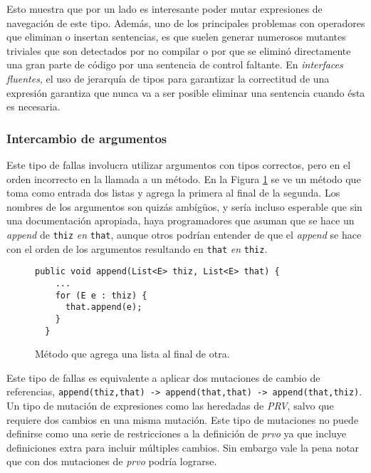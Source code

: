 Esto muestra que por un lado es interesante poder mutar expresiones de navegaci\'on de este tipo. Adem\'as, uno de los principales problemas con operadores que eliminan o insertan sentencias, es que suelen generar numerosos mutantes triviales que son detectados por no compilar o por que se elimin\'o directamente una gran parte de c\'odigo por una sentencia de control faltante. En \emph{interfaces fluentes}, el uso de jerarqu\'ia de tipos para garantizar la correctitud de una expresi\'on garantiza que nunca va a ser posible eliminar una sentencia cuando \'esta es necesaria.

\subsubsection{Intercambio de argumentos}

Este tipo de fallas involucra utilizar argumentos con tipos correctos, pero en el orden incorrecto en la llamada a un m\'etodo. En la Figura \ref{figures.examples.argumentSwap.example1} se ve un m\'etodo que toma como entrada dos listas y agrega la primera al final de la segunda. Los nombres de los argumentos son quiz\'as amb\'ig\"{u}os, y ser\'ia incluso esperable que sin una documentaci\'on apropiada, haya programadores que asuman que se hace un \emph{append} de \texttt{thiz} \emph{en} \texttt{that}, aunque otros podr\'ian entender de que el \emph{append} se hace con el orden de los argumentos resultando en \texttt{that} \emph{en} \texttt{thiz}. 

\begin{figure}
	\begin{lstlisting}[frame=single, mathescape=true,framexleftmargin=1.5em]
  public void append(List<E> thiz, List<E> that) {
    ...
    for (E e : thiz) {
      that.append(e);
    }
  }
	\end{lstlisting}
	\caption{M\'etodo que agrega una lista al final de otra.}
	\label{figures.examples.argumentSwap.example1}
\end{figure}

Este tipo de fallas es equivalente a aplicar dos mutaciones de cambio de referencias, \lstinline|append(thiz,that) -> append(that,that) -> append(that,thiz)|. Un tipo de mutaci\'on de expresiones como las heredadas de \emph{PRV}, salvo que requiere dos cambios en una misma mutaci\'on. Este tipo de mutaciones no puede definirse como una serie de restricciones a la definici\'on de \emph{prvo} ya que incluye definiciones extra para incluir m\'ultiples cambios. Sin embargo vale la pena notar que con dos mutaciones de \emph{prvo} podr\'ia lograrse.


